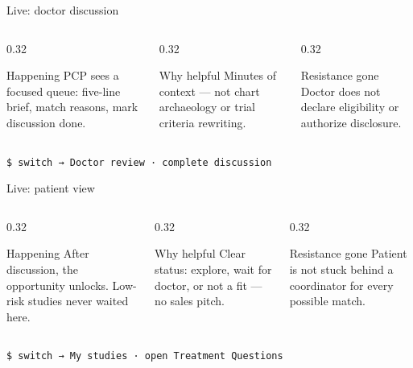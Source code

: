 \documentclass[aspectratio=169,10pt]{beamer}
\begin{document}
\begin{frame}{Live: doctor discussion}
\begin{columns}[T]
\begin{column}{0.32\textwidth}
\begin{tbox}{Happening}
\small
PCP sees a focused queue: five-line brief, match reasons, mark discussion done.
\end{tbox}
\end{column}
\begin{column}{0.32\textwidth}
\begin{tbox}{Why helpful}
\small
Minutes of context --- not chart archaeology or trial criteria rewriting.
\end{tbox}
\end{column}
\begin{column}{0.32\textwidth}
\begin{tbox}{Resistance gone}
\small
Doctor does \alert{not} declare eligibility or authorize disclosure.
\end{tbox}
\end{column}
\end{columns}
\vskip12pt
\centering\small\texttt{\$ switch → Doctor review · complete discussion}\,\terminalcursor
\end{frame}

\begin{frame}{Live: patient view}
\begin{columns}[T]
\begin{column}{0.32\textwidth}
\begin{tbox}{Happening}
\small
After discussion, the opportunity unlocks. Low-risk studies never waited here.
\end{tbox}
\end{column}
\begin{column}{0.32\textwidth}
\begin{tbox}{Why helpful}
\small
Clear status: explore, wait for doctor, or not a fit --- no sales pitch.
\end{tbox}
\end{column}
\begin{column}{0.32\textwidth}
\begin{tbox}{Resistance gone}
\small
Patient is not stuck behind a coordinator for every possible match.
\end{tbox}
\end{column}
\end{columns}
\vskip12pt
\centering\small\texttt{\$ switch → My studies · open Treatment Questions}\,\terminalcursor
\end{frame}
\end{document}
